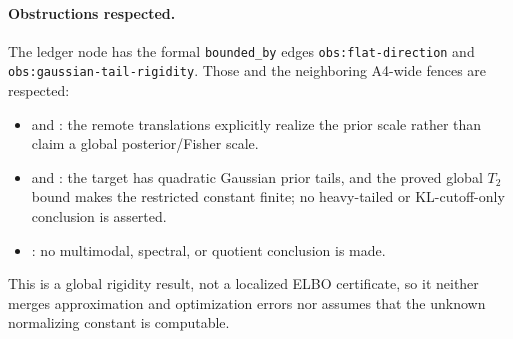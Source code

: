 \documentclass[../main.tex]{subfiles}
\begin{document}
\paragraph{Obstructions respected.}
The ledger node has the formal \texttt{bounded\_by} edges \texttt{obs:flat-direction} and
\texttt{obs:gaussian-tail-rigidity}.  Those and the neighboring A4-wide fences are respected:
\begin{itemize}[leftmargin=*]
 \item {} and : the remote translations
 explicitly realize the prior scale rather than claim a global posterior/Fisher scale.
 \item {} and : the target has
 quadratic Gaussian prior tails, and the proved global $T_2$ bound makes the restricted constant
 finite; no heavy-tailed or KL-cutoff-only conclusion is asserted.
 \item {}: no multimodal, spectral, or quotient conclusion is made.
\end{itemize}
This is a global rigidity result, not a localized ELBO certificate, so it neither merges
approximation and optimization errors nor assumes that the unknown normalizing constant is
computable.
\end{document}
